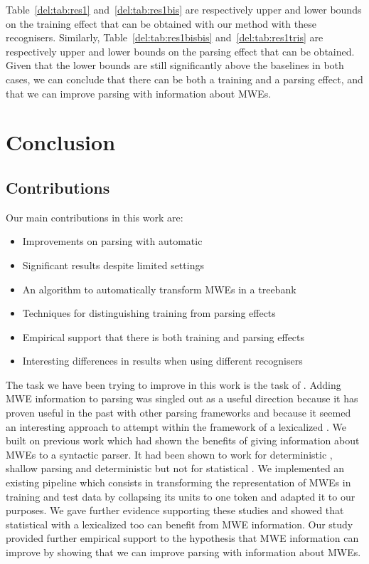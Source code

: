 \documentclass[output=paper]{langsci/langscibook}
\begin{document}
\indent Table~\ref{del:tab:res1} and~\ref{del:tab:res1bis} are respectively upper and lower bounds on the training effect that can be obtained with our method with these recognisers. Similarly, Table~\ref{del:tab:res1bisbis} and~\ref{del:tab:res1tris} are respectively upper and lower bounds on the parsing effect that can be obtained. Given that the lower bounds are still significantly above the baselines in both cases, we can conclude that there can be both a training and a parsing effect, and that we can improve  parsing with information about MWEs.

\section{Conclusion}
\label{del:ccl}
\subsection{Contributions}
Our main contributions in this work are:
\begin{itemize}
    \setlength\itemsep{0pt}
    \item Improvements on  parsing with automatic 
    \item Significant results despite limited settings
    \item An algorithm to automatically transform MWEs in a treebank
    \item Techniques for distinguishing training from parsing effects
    \item Empirical support that there is both training and parsing effects
    \item Interesting differences in results when using different recognisers
\end{itemize}
The task we have been trying to improve in this work is the task of . Adding MWE information to  parsing was singled out as a useful direction because it has proven useful in the past with other parsing frameworks and because it seemed an interesting approach to attempt within the framework of a lexicalized . We built on previous work which had shown the benefits of giving information about MWEs to a syntactic parser. It had been shown to work for deterministic , shallow parsing and deterministic  but not for statistical . We implemented an existing pipeline which consists in transforming the representation of MWEs in training and test data by collapsing its units to one token and adapted it to our purposes. We gave further evidence supporting these studies and showed that statistical  with a lexicalized  too can benefit from MWE information. Our study provided further empirical support to the hypothesis that MWE information can improve  by showing that we can improve  parsing with information about MWEs. \\
\end{document}
